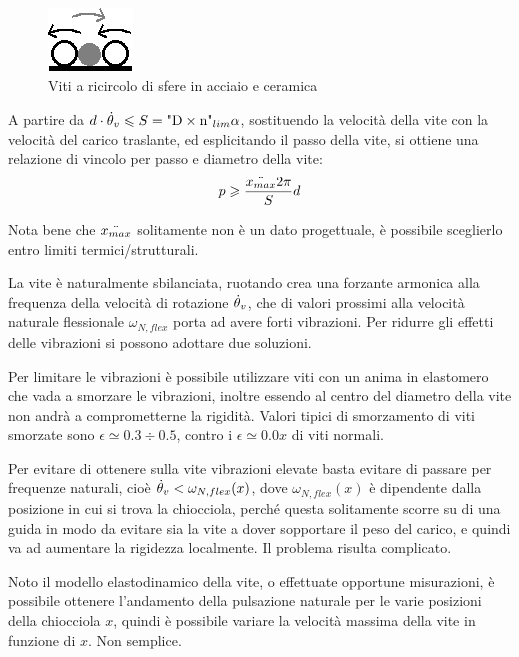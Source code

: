 \begin{figure}[h]
    \centering
    \includegraphics[width=0.2\textwidth]{Immagini/Viti_A_C.png}
    \caption{Viti a ricircolo di sfere in acciaio e ceramica}
\end{figure}

A partire da \( d\cdot \dot{\theta}_v \leqslant S = \text{"D}\times \text{n"}_{lim} \alpha \), sostituendo la velocità della vite con la velocità del carico traslante, ed esplicitando il passo della vite, si ottiene una relazione di vincolo per passo e diametro della vite:
\[ p \geqslant \frac{\Ddot{x_{max}} 2\pi }{S} d \]

Nota bene che \(\Ddot{x_{max}}\) solitamente non è un dato progettuale, è possibile sceglierlo entro limiti termici/strutturali.

La vite è naturalmente sbilanciata, ruotando crea una forzante armonica alla frequenza della velocità di rotazione \( \dot{\theta}_v \), che di valori prossimi alla velocità naturale flessionale \(\omega_{N,flex}\) porta ad avere forti vibrazioni.
Per ridurre gli effetti delle vibrazioni si possono adottare due soluzioni.

Per limitare le vibrazioni è possibile utilizzare viti con un anima in elastomero che vada a smorzare le vibrazioni, inoltre essendo al centro del diametro della vite non andrà a comprometterne la rigidità. Valori tipici di smorzamento di viti smorzate sono \(\epsilon \simeq 0.3 \div 0.5\), contro i \(\epsilon \simeq 0.0x \) di viti normali.

Per evitare di ottenere sulla vite vibrazioni elevate basta evitare di passare per frequenze naturali, cioè \( \dot{\theta}_v < \omega_{N,flex}(x) \), dove \( \omega_{N,flex}(x) \) è dipendente dalla posizione in cui si trova la chiocciola, perché questa solitamente scorre su di una guida in modo da evitare sia la vite a dover sopportare il peso del carico, e quindi va ad aumentare la rigidezza localmente. Il problema risulta complicato.

Noto il modello elastodinamico della vite, o effettuate opportune misurazioni, è possibile ottenere l'andamento della pulsazione naturale per le varie posizioni della chiocciola \(x\), quindi è possibile variare la  velocità massima della vite in funzione di \(x\). Non semplice.

